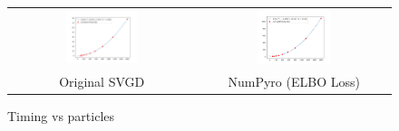 \begin{figure}[!htbp]
    \centering
    \begin{tabular}{@{}cc@{}}
            \includegraphics[width=0.40\textwidth]{figs/toy-timing-particles.png} & \includegraphics[width=0.40\textwidth]{figs/toy-timing-particles-numpyro-elbo.png}\\
        \small Original SVGD & NumPyro (ELBO Loss) \\
    \end{tabular}
    \caption{Timing vs particles }
    \label{fig:my_label}
\end{figure}
